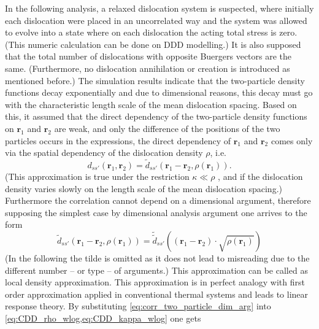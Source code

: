 In the following analysis, a relaxed dislocation system is suspected, where initially each dislocation were placed in an uncorrelated way and the system was allowed to evolve into a state where on each dislocation the acting total stress is zero. (This numeric calculation can be done on DDD modelling.) It is also supposed that the total number of dislocations with opposite Buergers vectors are the same. (Furthermore, no dislocation annihilation or creation is introduced as mentioned before.) The simulation results indicate that the two-particle density functions decay exponentially and due to dimensional reasons, this decay must go with the characteristic length scale of the mean dislocation spacing. Based on this, it assumed that the direct dependency of the two-particle density functions on ${{{\mathbf{r}}_1}}$ and ${{{\mathbf{r}}_2}}$ are weak, and only the difference of the positions of the two particles  occurs in the expressions, the direct dependency of ${{{\mathbf{r}}_1}}$ and ${{{\mathbf{r}}_2}}$ comes only via the spatial dependency of the dislocation density $\rho$, i.e.
\begin{equation}
{d_{ss'}}\left( {{{\mathbf{r}}_1},{{\mathbf{r}}_2}} \right) = {{\tilde d}_{ss'}}\left( {{{\mathbf{r}}_1} - {{\mathbf{r}}_2},\rho \left( {{{\mathbf{r}}_1}} \right)} \right).
\end{equation}
(This approximation is true under the restriction $\kappa  \ll \rho $ \cite{Groma_2003_AM,PhysRevB.93.214110}, and if the dislocation density varies slowly on the length scale of the mean dislocation spacing.) Furthermore the correlation cannot depend on a dimensional argument, therefore supposing the simplest case by dimensional analysis argument one arrives to the form 
\begin{equation} \label{eq:corr_two_particle_dim_arg}
{\tilde d_{ss'}}\left( {{{\mathbf{r}}_1} - {{\mathbf{r}}_2},\rho \left( {{{\mathbf{r}}_1}} \right)} \right) = {\tilde {\tilde {d}}}_{ss'}\left( {\left( {{{\mathbf{r}}_1} - {{\mathbf{r}}_2}} \right) \cdot \sqrt {\rho \left( {{{\mathbf{r}}_1}} \right)} } \right)
\end{equation}
(In the following the tilde is omitted as it does not lead to misreading due to the different number -- or type -- of arguments.) This approximation can be called as local density approximation. This approximation is in perfect analogy with first order approximation applied in conventional thermal systems and leads to linear response theory. By substituting \cref{eq:corr_two_particle_dim_arg} into \cref{eq:CDD_rho_wlog,eq:CDD_kappa_wlog} one gets
